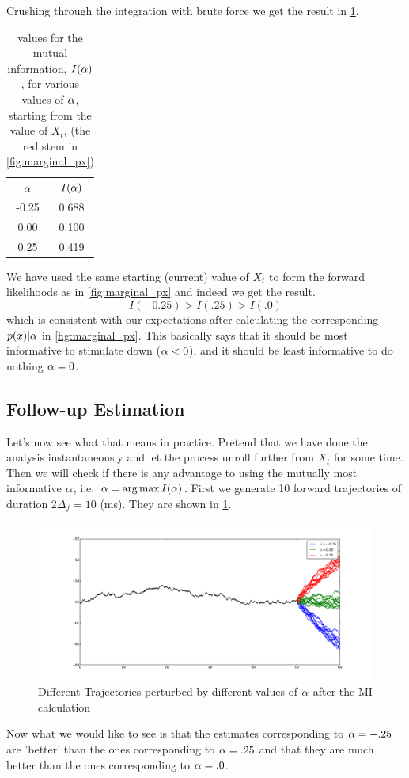 \documentclass{article}
\begin{document}
Crushing through the integration with brute force we get the result
in \cref{tab:MI_3alphas_basic_quad}.
\begin{table}
\begin{centering}
\begin{tabular}{cc}
${\alpha}$& $I({\alpha})$ \\
-0.25  &
 0.688 
\\
0.00 &
   0.100 
\\
   0.25 &
   0.419 
\end{tabular}
\caption{values for the mutual information, $I({\alpha})$, for various values of
${\alpha}$, starting from the value of $X_t$, (the red stem in
\cref{fig:marginal_px})}
\label{tab:MI_3alphas_basic_quad}
\end{centering}
\end{table}
We have used the same starting (current) value of $X_t$ to form the forward
likelihoods as in \cref{fig:marginal_px} and indeed we get the result.
$$I(-0.25) >I (.25) > I(.0)$$
which is consistent with our expectations after calculating the corresponding
$p(x)|{\alpha}$ in \cref{fig:marginal_px}. This basically says that it should be most
informative to stimulate down (${\alpha}<0$), and it should be least informative to
do nothing ${\alpha}=0$.

 \subsection{Follow-up Estimation}
 Let's now see what that means in practice. Pretend that we have done the
 analysis instantaneously and let the process unroll further from $X_t$ for
some time. Then we will check if there is any advantage to
 using the mutually most informative ${\alpha}$, i.e.\ $\a = \argmax I(\a)$.
First we generate 10 forward trajectories of duration 2$\Delta_f = 10$ (ms).
They are shown in \cref{fig:perturbed_trajectories}. 
\begin{figure}[htp]
\begin{center}
  \includegraphics[width=1\textwidth]{Figs/MIML/forward_sims.pdf}
  \caption[labelInTOC]{Different Trajectories perturbed by different values of
  ${\alpha}$ after the MI calculation}
  \label{fig:perturbed_trajectories}
\end{center}
\end{figure}
% 
Now what we would like to see is that the estimates corresponding to ${\alpha}=-.25$
are 'better' than the ones corresponding to ${\alpha}=.25$ and that they are much
better than the ones corresponding to ${\alpha}=.0$.
\end{document}
